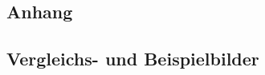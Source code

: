 
\begin{appendices}
\renewcommand{\appendixname}{ANHANG}
\renewcommand{\appendixtocname}{\appendixname} 
\addappheadtotoc 


\part*{Anhang}
\chapter{Vergleichs- und Beispielbilder}

\end{appendices}
